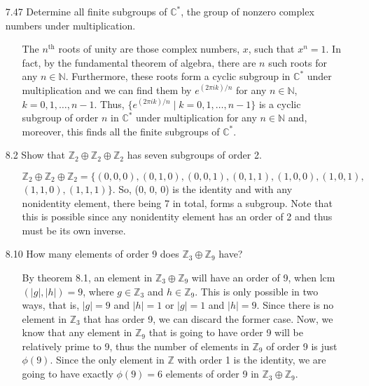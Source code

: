 \documentclass[12pt]{article}
\begin{document}
\begin{enumerate}
\item[7.47] Determine all finite subgroups of $\mathbb{C}^*$, the group of nonzero complex
numbers under multiplication.
\begin{enumerate}
\item[] The $n^{\mbox{th}}$ roots of unity are those complex numbers, $x$, such that $x^n = 1$. In fact,
by the fundamental theorem of algebra, there are $n$ such roots for any $n \in \mathbb{N}$.
Furthermore, these roots form a cyclic subgroup in $\mathbb{C}^*$ under multiplication and 
we can find them by $e^{(2\pi ik)/n}$ for any $n \in \mathbb{N}$, $k = 0, 1, \ldots, n - 1$. Thus,
$\{ e^{(2\pi ik)/n} \mid k = 0, 1, \ldots, n - 1 \}$ is a cyclic subgroup of order $n$ in 
$\mathbb{C}^*$ under multiplication for any $n \in \mathbb{N}$ and, moreover, 
this finds all the finite subgroups of $\mathbb{C}^*$. 
\end{enumerate}

\item[8.2] Show that $\mathbb{Z}_2 \oplus \mathbb{Z}_2 \oplus \mathbb{Z}_2$ has
seven subgroups of order 2.
\begin{enumerate}
\item[] $\mathbb{Z}_2 \oplus \mathbb{Z}_2 \oplus \mathbb{Z}_2 = \{ (0, 0, 0), (0, 1, 0),
(0, 0, 1), (0, 1, 1), (1, 0, 0), (1, 0, 1),$\\$ (1, 1, 0), (1, 1, 1) \}$. So, 
(0, 0, 0) is the identity and with any nonidentity element, there being 7 in total, 
forms a subgroup. Note that this is possible since any nonidentity element has an order of
2 and thus must be its own inverse.
\end{enumerate}

\item[8.10] How many elements of order 9 does $\mathbb{Z}_3 \oplus \mathbb{Z}_9$ have?
\begin{enumerate}
\item[] By theorem 8.1, an element in $\mathbb{Z}_3 \oplus \mathbb{Z}_9$ will have an order
of 9, when lcm$(|g|, |h|) = 9$, where $g \in \mathbb{Z}_3$ and $h \in \mathbb{Z}_9$. This
is only possible in two ways, that is, $|g| = 9$ and $|h| = 1$ or $|g| = 1$ and $|h| = 9$.
Since there is no element in $\mathbb{Z}_3$ that has order 9, we can discard the former
case. Now, we know that any element in $\mathbb{Z}_9$ that is going to have order 9 will
be relatively prime to 9, thus the number of elements in $\mathbb{Z}_9$ of order 9 is 
just $\phi(9)$. Since the only element in $\mathbb{Z}$ with order 1 is the identity, 
we are going to have exactly $\phi(9) = 6$ elements of order 9 in $\mathbb{Z}_3 \oplus \mathbb{Z}_9$.
\end{enumerate}


\end{enumerate}
\end{document}
